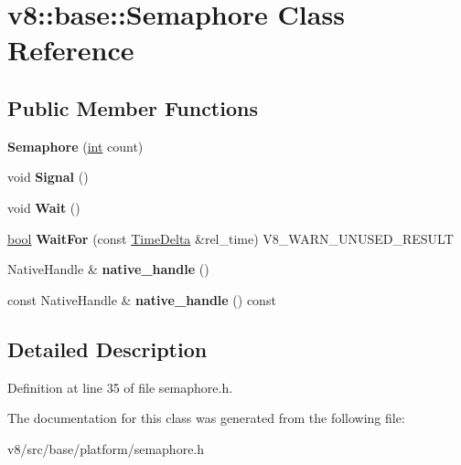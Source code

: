 \hypertarget{classv8_1_1base_1_1Semaphore}{}\section{v8\+:\+:base\+:\+:Semaphore Class Reference}
\label{classv8_1_1base_1_1Semaphore}
\subsection*{Public Member Functions}
\begin{DoxyCompactItemize}
\item 
\mbox{\label{classv8_1_1base_1_1Semaphore_a6e6256b4b8007e24a6cd75d88016013b}} 
{\bfseries Semaphore} (\mbox{\hyperlink{classint}{int}} count)
\item 
\mbox{\label{classv8_1_1base_1_1Semaphore_a95ee194fdea88172c20132a95ac8ca59}} 
void {\bfseries Signal} ()
\item 
\mbox{\label{classv8_1_1base_1_1Semaphore_afa492a527fe740fb20024a4146833f32}} 
void {\bfseries Wait} ()
\item 
\mbox{\label{classv8_1_1base_1_1Semaphore_aa42f3f944d0de73d7cbae90ad1e5cf58}} 
\mbox{\hyperlink{classbool}{bool}} {\bfseries Wait\+For} (const \mbox{\hyperlink{classv8_1_1base_1_1TimeDelta}{Time\+Delta}} \&rel\+\_\+time) V8\+\_\+\+W\+A\+R\+N\+\_\+\+U\+N\+U\+S\+E\+D\+\_\+\+R\+E\+S\+U\+LT
\item 
\mbox{\label{classv8_1_1base_1_1Semaphore_ae8cf6e4317e9ad6098d3bae3fdc355ce}} 
Native\+Handle \& {\bfseries native\+\_\+handle} ()
\item 
\mbox{\label{classv8_1_1base_1_1Semaphore_a51b4b625dcf543bcc1c0a92ca1018ca9}} 
const Native\+Handle \& {\bfseries native\+\_\+handle} () const
\end{DoxyCompactItemize}


\subsection{Detailed Description}


Definition at line 35 of file semaphore.\+h.



The documentation for this class was generated from the following file\+:\begin{DoxyCompactItemize}
\item 
v8/src/base/platform/semaphore.\+h\end{DoxyCompactItemize}
